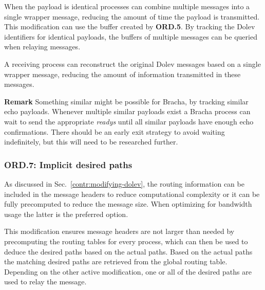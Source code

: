 When the payload is identical processes can combine multiple messages into a single wrapper message, reducing the amount of time the payload is transmitted. This modification can use the buffer created by \textbf{ORD.5}.
By tracking the Dolev identifiers for identical payloads, the buffers of multiple messages can be queried when relaying messages.

A receiving process can reconstruct the original Dolev messages based on a single wrapper message, reducing the amount of information transmitted in these messages.

\textbf{Remark}
Something similar might be possible for Bracha, by tracking similar echo payloads. Whenever multiple similar payloads exist a Bracha process can wait to send the appropriate \textit{readys} until all similar payloads have enough echo confirmations. There should be an early exit strategy to avoid waiting indefinitely, but this will need to be researched further.




\subsubsection{ORD.7: Implicit desired paths}
As discussed in Sec.~\ref{contr:modifying-dolev}, the routing information can be included in the message headers to reduce computational complexity or it can be fully precomputed to reduce the message size. When optimizing for bandwidth usage the latter is the preferred option.

This modification ensures message headers are not larger than needed by precomputing the routing tables for every process, which can then be used to deduce the desired paths based on the actual paths. Based on the actual paths the matching desired paths are retrieved from the global routing table. Depending on the other active modification, one or all of the desired paths are used to relay the message.

